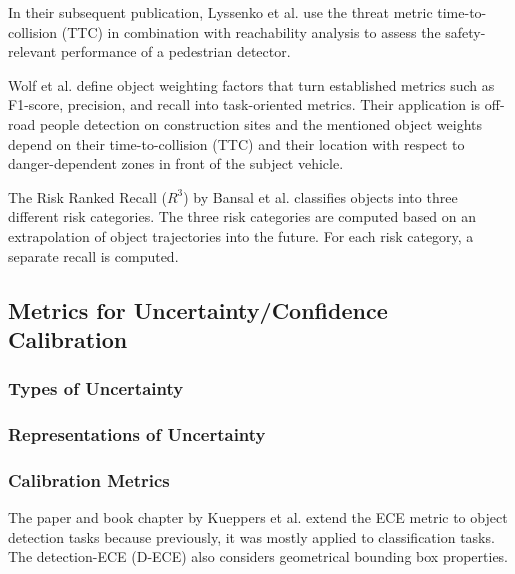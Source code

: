 \documentclass[conference]{IEEEtran}
\begin{document}
In their subsequent publication, Lyssenko et al. \cite{Lyssenko2022safety} use the threat metric time-to-collision (TTC) in combination with reachability analysis to assess the safety-relevant performance of a pedestrian detector. 

Wolf et al. \cite{Wolf2021people} define object weighting factors that turn established metrics such as F1-score, precision, and recall into task-oriented metrics. 
Their application is off-road people detection on construction sites and the mentioned object weights depend on their time-to-collision (TTC) and their location with respect to danger-dependent zones in front of the subject vehicle. 

The Risk Ranked Recall ($R^3$) by Bansal et al. \cite{Bansal2021riskrankedrecall} classifies objects into three different risk categories.
The three risk categories are computed based on an extrapolation of object trajectories into the future. 
For each risk category, a separate recall is computed. 



\subsection{Metrics for Uncertainty/Confidence Calibration}
\label{sec:self_reporting_metrics}

\subsubsection{Types of Uncertainty}
\label{sec:uncertainty_forms}

\subsubsection{Representations of Uncertainty}
\label{sec:uncertainty_representations}

\subsubsection{Calibration Metrics}
\label{sec:uncertainty_metrics_detail}

The paper \cite{Kueppers2020confidence} and book chapter \cite{Kueppers2022confidence} by Kueppers et al. extend the ECE metric to object detection tasks because previously, it was mostly applied to classification tasks. The detection-ECE (D-ECE) also considers geometrical bounding box properties. 
\end{document}
